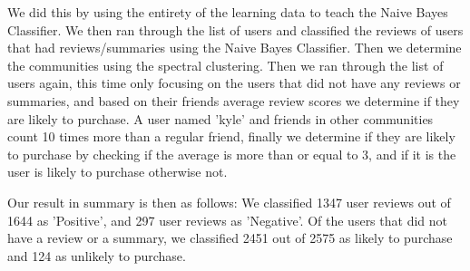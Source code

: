 	We did this by using the entirety of the learning data to teach the Naive Bayes Classifier.
	We then ran through the list of users and classified the reviews of users that had reviews/summaries using the Naive Bayes Classifier.
	Then we determine the communities using the spectral clustering.
	Then we ran through the list of users again, this time only focusing on the users that did not have any reviews or summaries, and based on their friends average review scores we determine if they are likely to purchase. A user named 'kyle' and friends in other communities count 10 times more than a regular friend, finally we determine if they are likely to purchase by checking if the average is more than or equal to 3, and if it is the user is likely to purchase otherwise not.
	
	Our result in summary is then as follows:
	We classified 1347 user reviews out of 1644 as 'Positive', and 297 user reviews as 'Negative'.
	Of the users that did not have a review or a summary, we classified 2451 out of 2575 as likely to purchase and 124 as unlikely to purchase.	


